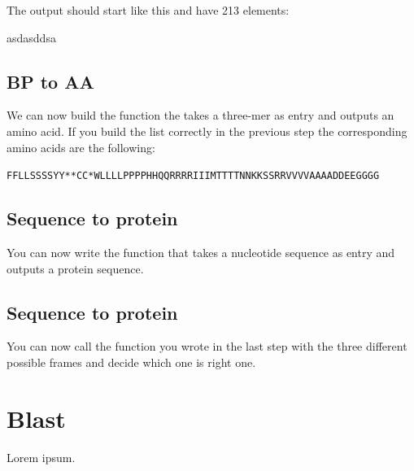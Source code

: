 \documentclass[a4paper,11pt]{article}
\begin{document}
The output should start like this and have 213 elements:

asdasddsa

\subsection{BP to AA}
We can now build the function the takes a three-mer as entry and outputs an amino acid. If you build the list correctly in the previous step the corresponding amino acids are the following:

\texttt{FFLLSSSSYY**CC*WLLLLPPPPHHQQRRRRIIIMTTTTNNKKSSRRVVVVAAAADDEEGGGG}

\subsection{Sequence to protein}
You can now write the function that takes a nucleotide sequence as entry and outputs a protein sequence.

\subsection{Sequence to protein}
You can now call the function you wrote in the last step with the three different possible frames and decide which one is right one.

\section{Blast}
Lorem ipsum.
\end{document}

